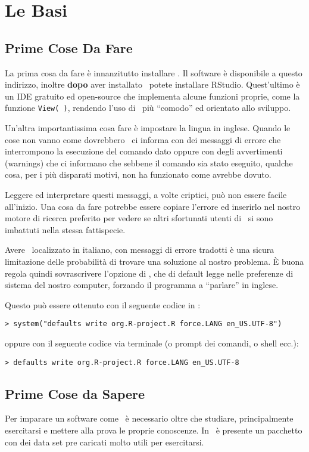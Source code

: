 \chapter{Le Basi}
\section{Prime Cose Da Fare}
La prima cosa da fare è innanzitutto installare \erre. Il software è disponibile a questo indirizzo, inoltre \textbf{dopo} aver installato \erre\ potete installare \textsf{RStudio}. Quest'ultimo è un \textsf{IDE} gratuito ed open-source che implementa alcune funzioni proprie, come la funzione \lstinline!View( )!, rendendo l'uso di \erre\ più ``comodo'' ed orientato allo sviluppo.

Un'altra importantissima cosa fare è impostare la lingua in inglese.
Quando le cose non vanno come dovrebbero \erre\ ci informa con dei messaggi di errore che interrompono la esecuzione del comando dato oppure con degli avvertimenti (warnings) che ci informano che sebbene il comando sia stato eseguito, qualche cosa, per i più disparati motivi, non ha funzionato come avrebbe dovuto.

Leggere ed interpretare questi messaggi, a volte criptici, può non essere facile all'inizio. Una cosa da fare potrebbe essere copiare l'errore ed inserirlo nel nostro motore di ricerca preferito per vedere se altri sfortunati utenti di \erre\ si sono imbattuti nella stessa fattispecie.

Avere \erre\ localizzato in italiano, con messaggi di errore tradotti è una sicura limitazione delle probabilità di trovare una soluzione al nostro problema. È buona regola quindi sovrascrivere l'opzione di \erre, che di default legge nelle preferenze di sistema del nostro computer, forzando il programma a ``parlare'' in inglese.

Questo può essere ottenuto con il seguente codice in \erre:
\begin{lstlisting}
> system("defaults write org.R-project.R force.LANG en_US.UTF-8")
\end{lstlisting}
oppure con il seguente codice via terminale (o prompt dei comandi, o shell ecc.):
\begin{lstlisting}
> defaults write org.R-project.R force.LANG en_US.UTF-8
\end{lstlisting}

\section{Prime Cose da Sapere}
Per imparare un software come \erre\ è necessario oltre che studiare, principalmente esercitarsi e mettere alla prova le proprie conoscenze. In \erre\ è presente un pacchetto con dei data set pre caricati molto utili per esercitarsi.

